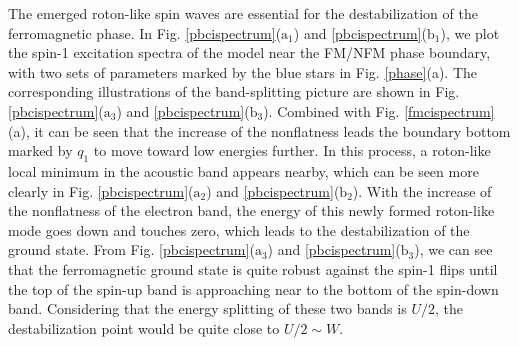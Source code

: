 \documentclass[amsmath,superscriptaddress,showpacs,aps,prb,twocolumn]{revtex4-1}
\begin{document}
\par The emerged roton-like spin waves are essential for the destabilization of the ferromagnetic phase. In Fig. \ref{pbcispectrum}($\text{a}_1$) and \ref{pbcispectrum}($\text{b}_1$), we plot the spin-1 excitation spectra of the model near the FM/NFM phase boundary, with two sets of parameters marked by the blue stars in Fig. \ref{phase}(a). The corresponding illustrations of the band-splitting picture are shown in Fig. \ref{pbcispectrum}($\text{a}_3$) and \ref{pbcispectrum}($\text{b}_3$). Combined with Fig. \ref{fmcispectrum}(a), it can be seen that the increase of the nonflatness leads the boundary bottom marked by $q_1$ to move toward low energies further. In this process, a roton-like local minimum in the acoustic band appears nearby, which can be seen more clearly in Fig. \ref{pbcispectrum}($\text{a}_2$) and \ref{pbcispectrum}($\text{b}_2$). With the increase of the nonflatness of the electron band, the energy of this newly formed roton-like mode goes down and touches zero, which leads to the destabilization of the ground state. From Fig. \ref{pbcispectrum}($\text{a}_3$) and \ref{pbcispectrum}($\text{b}_3$), we can see that the ferromagnetic ground state is quite robust against the spin-1 flips until the top of the spin-up band is approaching near to the bottom of the spin-down band. Considering that the energy splitting of these two bands is $U/2$, the destabilization point would be quite close to $U/2\sim W$.
\end{document}
